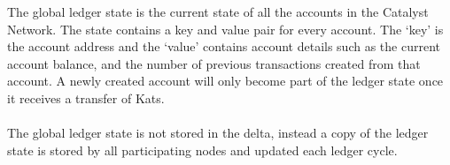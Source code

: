 The global ledger state is the current state of all the accounts in the Catalyst Network. The state contains a key and value pair for every account. The `key' is the account address and the `value' contains account details such as the current account balance, and the number of previous transactions created from that account. A newly created account will only become part of the ledger state once it receives a transfer of Kats.
\\
\\
The global ledger state is not stored in the delta, instead a copy of the ledger state is stored by all participating nodes and updated each ledger cycle.